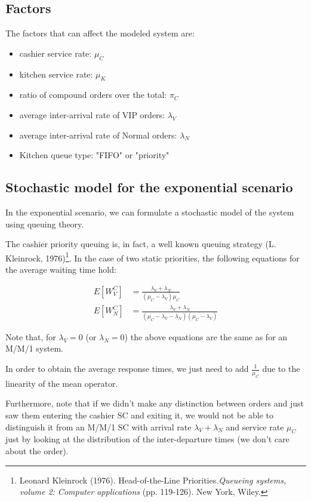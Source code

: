 \subsection{Factors}
The factors that can affect the modeled system are:
\begin{itemize}
    \item cashier service rate: $\mu_C$
    \item kitchen service rate: $\mu_K$
    \item ratio of compound orders over the total: $\pi_C$ 
    \item average inter-arrival rate of VIP orders: $\lambda_V$
    \item average inter-arrival rate of Normal orders: $\lambda_N$
    \item Kitchen queue type: "FIFO" or "priority"
\end{itemize}

\subsection{Stochastic model for the exponential scenario}
In the exponential scenario, we can formulate a stochastic model of the system
using queuing theory.

The cashier priority queuing is, in fact, a well known queuing 
strategy (L. Kleinrock, 1976)\footnote{Leonard Kleinrock (1976). Head-of-the-Line Priorities.\emph{Queueing systems, volume 2: Computer applications} (pp. 119-126). New York, Wiley.}. In the case of two static priorities, the following equations for
the average waiting time hold:

\begin{align}
    E[W^C_{V}] &= \frac{\lambda_V + \lambda_N}{(\mu_C-\lambda_{V})\mu_C} \label{eq:waitvip}\\
    E[W^C_{N}] &= \frac{\lambda_V + \lambda_N}{(\mu_C-\lambda_{V}-\lambda_N)(\mu_C-\lambda_{V})} \label{eq:waitnorm}
\end{align}

Note that, for $\lambda_V = 0$ (or $\lambda_N = 0$) the above equations are the 
same as for an M/M/1 system.

In order to obtain the average response times, we just need to add $\frac{1}{\mu_C}$
due to the linearity of the mean operator.

Furthermore, note that if we didn't make any distinction between orders and just 
saw them entering the cashier SC and exiting it, we would not be able to 
distinguish it from an M/M/1 SC with arrival rate $\lambda_V + \lambda_N$ and 
service rate $\mu_C$ just by looking at the distribution of the 
inter-departure times (we don't care about the order).

